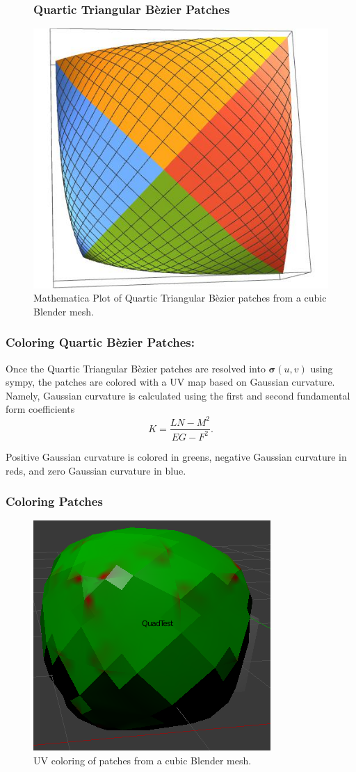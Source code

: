\documentclass[11pt]{beamer}
\begin{document}
	\begin{frame}
		\begin{figure}[h]
			\frametitle{Quartic Triangular B\`ezier Patches}
			\centering
			\includegraphics[width=.43\linewidth]{img/bezier_patch}
			\caption{Mathematica Plot of Quartic Triangular B\`ezier patches from  a cubic Blender mesh.}
		\end{figure}
	\end{frame}

	\begin{frame}
		\frametitle{Coloring Quartic B\`ezier Patches:}
			Once the Quartic Triangular B\`ezier patches are resolved into $\bm{\sigma}(u,v)$ using sympy, the patches are colored with a UV map based on Gaussian curvature. Namely, Gaussian curvature is calculated using the first and second fundamental form coefficients $$K = \dfrac{LN-M^2}{EG-F^2}.$$
			
			Positive Gaussian curvature is colored in greens, negative Gaussian curvature in reds, and zero Gaussian curvature in blue.
	\end{frame}
	
	\begin{frame}
		\frametitle{Coloring Patches}
		\begin{figure}
			\centering
			\includegraphics[width=.43\linewidth]{img/cube-color}
			\caption{UV coloring of patches from a cubic Blender mesh.}
		\end{figure}
	\end{frame}
	
\end{document}
